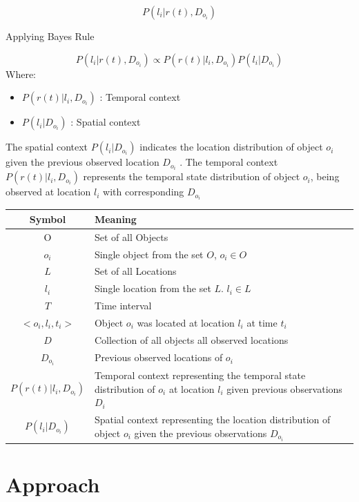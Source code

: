 \documentclass{llncs}
\begin{document}
    \begin{equation}
	    P( l_i | r(t), D_{o_i})
    \end{equation}
    
    Applying Bayes Rule
    
    \begin{equation}\label{eq:3}
	P( l_i | r(t), D_{o_i}) \propto P(r(t) | l_i, D_{o_i})  P(l_i | D_{o_i})
    \end{equation}
    Where:
    \begin{itemize}
    \item $P(r(t) | l_i, D_{o_i})$ : Temporal context 
    \item $P(l_i | D_{o_i})$ : Spatial context
    \end{itemize}
    
     The spatial context $P(l_i | D_{o_i})$ indicates the location distribution of object $o_i$ given the previous observed location $D_{o_i}$ . The temporal context $P(r(t) | l_i, D_{o_i})$ represents the temporal state distribution of object $o_i$, being observed at location $l_i$ with corresponding $D_{o_i}$
    


\begin{tabular}{cp{8cm}}
    \hline
	Symbol & Meaning\\
	\hline
	O & Set of all Objects\\
	$o_i$ & Single object from the set $O$, $o_i \in O$ \\
	$L$ & Set of all Locations\\
	$l_i$ & Single location from the set $L$. $l_i\in L$\\
    $T$ & Time interval\\
    \hline
	$<o_i,l_i,t_i>$ & Object $o_i$ was located at location $l_i$ at time $t_i$\\
	$D$ & Collection of all objects all observed locations\\
	$D_{o_i}$ & Previous observed locations of $o_i$\\ 
    \hline
     $P(r(t) | l_i, D_{o_i})$ &  Temporal context representing the temporal state distribution of $o_i$ at location $l_i$ given previous observations $D_i$\\
     $P(l_i | D_{o_i})$ & Spatial context representing the location distribution of object $o_i$ given the previous observations $D_{o_i}$\\
    \hline
\end{tabular}
\section{Approach}
\end{document}
